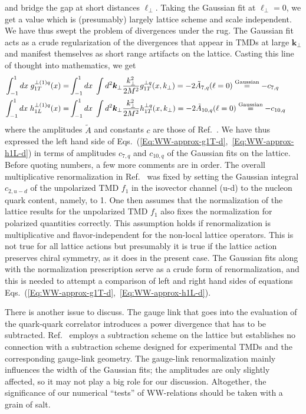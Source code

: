 \documentclass[a4paper,11pt]{article}
\newcommand{\ba}{\begin{eqnarray}}
\newcommand{\ea}{\end{eqnarray}}
\def\bflperp{{\bm \ell}_\perp}
\def\bfkperp{{\bm k}_\perp}
\def\kperp{k_\perp}
\begin{document}
and bridge the gap at short distances $\bflperp$.
Taking the Gaussian fit at $\bflperp = 0$, we get a value which is
(presumably) largely lattice scheme and scale independent. We have thus
swept the problem of divergences under the rug. The Gaussian fit acts as
a crude regularization of the divergences that appear in TMDs at large
$\bfkperp$ and manifest themselves as short range artifacts on the lattice.
Casting this line of thought into mathematics, we get
\ba
    	\int_{-1}^1 d x\; g_{1T}^{\perp(1)q}(x)
	= & \int_{-1}^1 d x\; \int  d^2 \bfkperp
	\frac{\kperp^2}{2M^2} g_{1T}^{\perp q}(x,\kperp)
	= -2 \tilde{A}_{7,q}( \ell = 0 )
	\stackrel{\text{\scriptsize Gaussian}}{=} -c_{7,q} \quad \quad \\
    	\int_{-1}^1 d x\; h_{1L}^{\perp(1)q}(x)
	= & \int_{-1}^1 d x\; \int  d^2 \bfkperp
	\frac{\kperp^2}{2M^2} h_{1T}^{\perp q}(x,\kperp)
	= -2 \tilde{A}_{10,q}( \ell = 0 )
	\stackrel{\text{\scriptsize Gaussian}}{=} -c_{10,q} \quad \quad
\ea
where the amplitudes $\tilde{A}$ and constants $c$ are those of Ref.~\cite{Musch:2010ka}.
We have thus expressed the left hand side of
Eqs.~(\ref{Eq:WW-approx-g1T-d},~\ref{Eq:WW-approx-h1L-d}) in terms of
amplitudes $c_{7,q}$ and $c_{10,q}$ of the Gaussian fits on the lattice.
Before quoting numbers, a few more comments are in order. The overall
multiplicative renormalization in Ref.~\cite{Musch:2010ka} was fixed by
setting the Gaussian integral $c_{2,u-d}$ of the unpolarized TMD $f_1$
in the isovector channel (u-d) to the nucleon quark content, namely, to 1.
 One then assumes that the normalization of the lattice results for the
unpolarized TMD $f_1$ also fixes the normalization for polarized quantities
correctly. This assumption holds if renormalization is multiplicative and
flavor-independent for the non-local lattice operators. This is not true
for all lattice actions \cite{Yoon:2017qzo} %
but presumably it is true if the lattice action preserves chiral symmetry,
as it does in the present case.
The Gaussian fits along with the normalization prescription serve as
a crude form of renormalization, and this is needed to attempt
a comparison of left and right hand sides of equations
Eqs.~(\ref{Eq:WW-approx-g1T-d},~\ref{Eq:WW-approx-h1L-d}).

There is another issue to discuss.
The gauge link that goes into the evaluation of the quark-quark correlator
introduces a power divergence that has to be subtracted.
Ref.~\cite{Musch:2010ka} employs a subtraction scheme on the lattice
but establishes no connection with a subtraction scheme designed for
experimental TMDs and the corresponding gauge-link geometry.
The gauge-link renormalization mainly
influences the width of the Gaussian fits; the amplitudes are only slightly
affected, so it may not play a big role for our discussion. Altogether, the
significance of our numerical ``tests'' of WW-relations should be taken
with a grain of salt.
\end{document}
